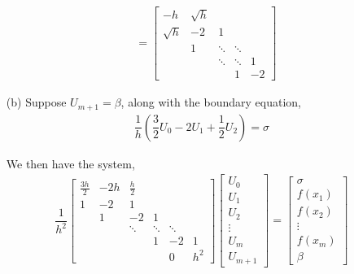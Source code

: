 \documentclass[10pt]{article}
\begin{document}
\begin{solution}[Solution]
\begin{enumerate}
\begin{align*}
            \\&=
            \left[\begin{array}{rrrrr}
                -h & \sqrt{h}    \\
                \sqrt{h}  & -2 & 1 \\
                & 1 & \ddots & \ddots    \\
                && \ddots & \ddots & 1    \\
                &&& 1  & -2 
            \end{array}\right]
        \end{align*}
\fi
    \item[(b)]
        Suppose \( U_{m+1} = \beta \), along with the boundary equation,
        \begin{align*}
            \dfrac{1}{h} \left( \dfrac{3}{2}U_0-2U_1+\dfrac{1}{2}U_2 \right) = \sigma \tag{*}
        \end{align*}
        
        We then have the system,
        \begin{align*}
            \dfrac{1}{h^2}
            \left[\begin{array}{cccccc}
                \frac{3h}{2} & -2h & \frac{h}{2} \\
                1 & -2 & 1 \\
                & 1 & -2 & 1 \\
                && \ddots & \ddots & \ddots \\
                &&& 1 & -2 & 1 \\
                &&&& 0 & h^2
            \end{array}\right]
            \left[\begin{array}{c}
                U_0 \\ U_1 \\ U_2 \\ \vdots \\ U_m \\ U_{m+1}
            \end{array}\right]
            =
            \left[\begin{array}{c}
                \sigma \\ f(x_1) \\ f(x_2) \\ \vdots \\ f(x_m) \\ \beta
            \end{array}\right]
        \end{align*}


\end{enumerate}
\end{solution}
\end{document}
